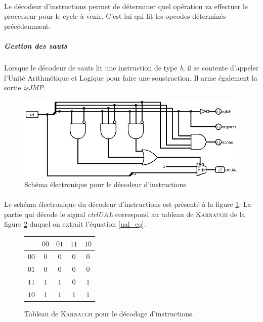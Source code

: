 \paragraph{}{
	Le décodeur d'instructions permet de déterminer quel opération va effectuer
	le processeur pour le cycle à venir. C'est lui qui lit les opcodes déterminés
	précédemment.
}
	\subparagraph{Gestion des sauts}{
		Lorsque le décodeur de sauts lit une instruction de type \textit{b},
		il se contente d'appeler l'Unité Arithmétique et Logique pour faire
		une soustraction. Il arme également la sortie \textit{isJMP}.
	}

\begin{figure}
	\label{decod_inst_circ}
	\centering
	\includegraphics[scale=0.4,origin=c]{circuits/deco_instru.png}
	\caption{Sch\'{e}ma \'{e}lectronique pour le d\'{e}codeur d'instructions}
\end{figure}

\paragraph{}{
	Le schéma électronique du décodeur d'instructions est présenté à la figure
	\ref{decod_inst_circ}. La partie qui décode le signal \textit{ctrlUAL} 
	correspond au tableau de \textsc{Karnaugh} de la figure 
	\ref{decod_ctrlual_karnaugh} duquel on extrait l'équation \ref{ual_eq}.
}


\begin{figure}
	\begin{center}
	\centering
	\begin{tabular}{|c|c|c|c|c|}
		\hline
		\backslashbox{$b_{3}b_{2}$}{$b_{1}b_{0}$} & $00$ & $01$ & $11$ & $10$ \\ 
		\hline 
		$00$ & $0$ & $0$ & $0$ & $0$ \\ 
		\hline 
		$01$ & $0$ & $0$ & $0$ & $0$ \\ 
		\hline 
		$11$ & $1$ & $1$ & $0$ & $1$ \\ 
		\hline 
		$10$ & $1$ & $1$ & $1$ & $1$ \\ 
		\hline 
	\end{tabular} 
	\end{center}
	\caption{
		\label{decod_ctrlual_karnaugh}
		Tableau de \textsc{Karnaugh} pour le décodage d'instructions.
	}
\end{figure}

